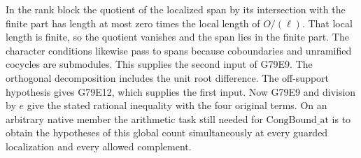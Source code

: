 In the rank block the quotient of the localized span by its
intersection with the finite part has length at most zero times
the local length of $O/(\ell)$. That local length is finite, so
the quotient vanishes and the span lies in the finite part.
The character conditions likewise pass to spans because
coboundaries and unramified cocycles are submodules. This supplies
the second input of G79E9. The orthogonal decomposition includes
the unit root difference. The off-support hypothesis gives G79E12,
which supplies the first input. Now G79E9 and division by $e$
give the stated rational inequality with the four original terms.
On an arbitrary native member the arithmetic task still needed
for $\mathrm{CongBound\_at}$ is to obtain the hypotheses of this
global count simultaneously at every guarded localization and every
allowed complement.
